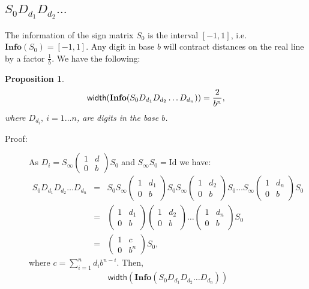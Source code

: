 \documentclass[11pt,a4paper]{article}
\newtheorem{prop}[tm]{Proposition}
\newenvironment{proof}
	{ \begin{description} \item[Proof:] \footnotesize }
	{ \end{description} }
\begin{document}
\subsection{$S_0 D_{d_1} D_{d_2} \ldots$}
The information of the sign matrix $S_0$ is the interval $[-1,1]$,
	i.e. $\textbf{Info}(S_0) = [-1,1]$. Any digit in base $b$ will
	contract distances on the real line by a factor $\frac{1}{b}$.
	We have the following:
	\begin{prop} \label{prop:Szero and width of information with base b}
		\[ {\sf width} ( {\bf Info} ( S_0 D_{d_1} D_{d_2}
			\ldots D_{d_n} ) ) = \frac{2}{b^n}, \]
		where $D_{d_i},\ i=1 \ldots n$, are digits in the base $b$.
	\end{prop}
	\begin{proof} As $D_i = S_\infty \begin{pmatrix} 1&d\\0&b \end{pmatrix}
	S_0$ and $S_\infty S_0 = \textrm{Id}$ we have:
	\[ \begin{array}{rcl}
		S_0 D_{d_1} D_{d_2} \ldots D_{d_n} &=& S_0 S_\infty
			\begin{pmatrix} 1&d_1\\0&b \end{pmatrix} S_0 S_\infty
			\begin{pmatrix} 1&d_2\\0&b \end{pmatrix} S_0 \ldots S_\infty
			\begin{pmatrix} 1&d_n\\0&b \end{pmatrix} S_0 \\
		&=& \begin{pmatrix} 1&d_1\\0&b \end{pmatrix}
			\begin{pmatrix} 1&d_2\\0&b \end{pmatrix} \ldots
			\begin{pmatrix} 1&d_n\\0&b \end{pmatrix} S_0 \\
		&=& \begin{pmatrix} 1&c\\0&b^n \end{pmatrix} S_0,
	\end{array} \]
	where $c = \sum_{i=1}^n d_i b^{n-i}$.
	Then,
	\[ \begin{array}{rcl}
		\textsf{width} (\textbf{Info}(S_0 D_{d_1} D_{d_2}\ldots D_{d_n}))

\end{array}\]
\end{proof}
\end{document}
